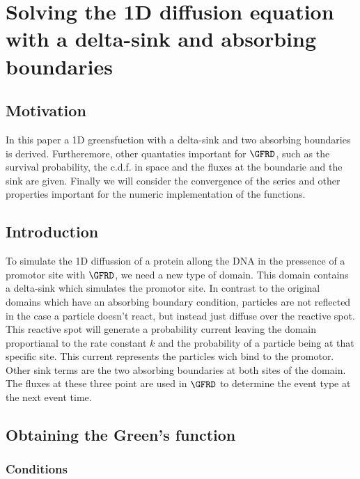 \section{Solving the 1D diffusion equation with a delta-sink and absorbing boundaries}

\subsection{Motivation}

In this paper a 1D greensfuction with a delta-sink and two absorbing boundaries is derived. Furtheremore, other quantaties important for $\GFRD$, such as the survival probability, the c.d.f. in space and the fluxes at the boundarie and the sink are given. Finally we will consider the convergence of the series and other properties important for the numeric implementation of the functions.

\subsection{Introduction}

To simulate the 1D diffussion of a protein allong the DNA in the pressence of a promotor site with $\GFRD$, we need a new type of domain. This domain contains a delta-sink which simulates the promotor site. In contrast to the original domains which have an absorbing boundary condition, particles are not reflected in the case a particle doesn't react, but instead just diffuse over the reactive spot. This reactive spot will generate a probability current leaving the domain proportianal to the rate constant $k$ and the probability of a particle being at that specific site. This current represents the particles wich bind to the promotor. Other sink terms are the two absorbing boundaries at both sites of the domain. The fluxes at these three point are used in $\GFRD$ to determine the event type at the next event time.

\subsection{Obtaining the Green's function}

\subsubsection{Conditions}


